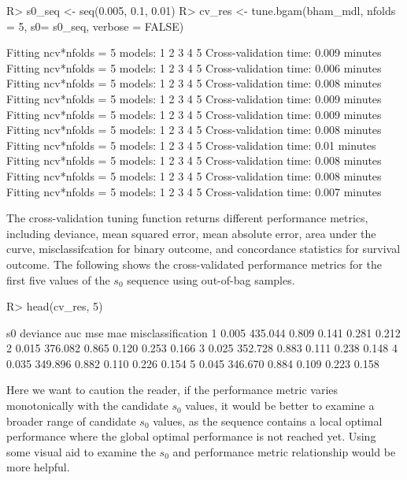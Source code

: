 \documentclass[
]{jss}
\begin{document}
\begin{CodeChunk}
\begin{CodeInput}
R> s0_seq <- seq(0.005, 0.1, 0.01)
R> cv_res <- tune.bgam(bham_mdl, nfolds = 5, s0= s0_seq, verbose = FALSE)
\end{CodeInput}
\begin{CodeOutput}
Fitting ncv*nfolds = 5 models: 
1 2 3 4 5 
 Cross-validation time: 0.009 minutes 
Fitting ncv*nfolds = 5 models: 
1 2 3 4 5 
 Cross-validation time: 0.006 minutes 
Fitting ncv*nfolds = 5 models: 
1 2 3 4 5 
 Cross-validation time: 0.008 minutes 
Fitting ncv*nfolds = 5 models: 
1 2 3 4 5 
 Cross-validation time: 0.009 minutes 
Fitting ncv*nfolds = 5 models: 
1 2 3 4 5 
 Cross-validation time: 0.009 minutes 
Fitting ncv*nfolds = 5 models: 
1 2 3 4 5 
 Cross-validation time: 0.008 minutes 
Fitting ncv*nfolds = 5 models: 
1 2 3 4 5 
 Cross-validation time: 0.01 minutes 
Fitting ncv*nfolds = 5 models: 
1 2 3 4 5 
 Cross-validation time: 0.008 minutes 
Fitting ncv*nfolds = 5 models: 
1 2 3 4 5 
 Cross-validation time: 0.008 minutes 
Fitting ncv*nfolds = 5 models: 
1 2 3 4 5 
 Cross-validation time: 0.007 minutes 
\end{CodeOutput}
\end{CodeChunk}

The cross-validation tuning function returns different performance
metrics, including deviance, mean squared error, mean absolute error,
area under the curve, misclassifcation for binary outcome, and
concordance statistics for survival outcome. The following shows the
cross-validated performance metrics for the first five values of the
\(s_0\) sequence using out-of-bag samples.

\begin{CodeChunk}
\begin{CodeInput}
R> head(cv_res, 5)
\end{CodeInput}
\begin{CodeOutput}
     s0 deviance   auc   mse   mae misclassification
1 0.005  435.044 0.809 0.141 0.281             0.212
2 0.015  376.082 0.865 0.120 0.253             0.166
3 0.025  352.728 0.883 0.111 0.238             0.148
4 0.035  349.896 0.882 0.110 0.226             0.154
5 0.045  346.670 0.884 0.109 0.223             0.158
\end{CodeOutput}
\end{CodeChunk}

Here we want to caution the reader, if the performance metric varies
monotonically with the candidate \(s_0\) values, it would be better to
examine a broader range of candidate \(s_0\) values, as the sequence
contains a local optimal performance where the global optimal
performance is not reached yet. Using some visual aid to examine the
\(s_0\) and performance metric relationship would be more helpful.
\end{document}
